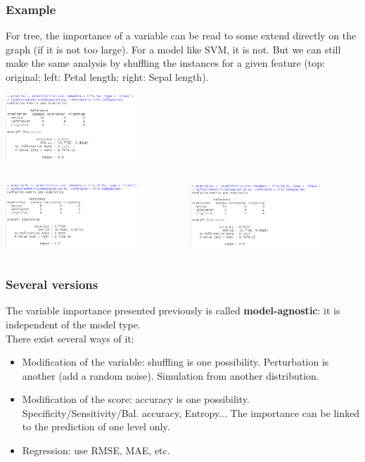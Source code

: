 \begin{frame}
\frametitle{Example}
\small
For tree, the importance of a variable can be read to some extend directly on the graph (if it is not too large). For a model like SVM, it is not. But we can still make the same analysis by shuffling the instances for a given feature (top: original; left: Petal length; right: Sepal length).
\\
\normalsize
\begin{center}
\includegraphics[width=5cm]{../Graphs/VarImp_iris_acc_svm.png}
\end{center}
\begin{columns}
\begin{column}{0.5\textwidth}
\includegraphics[width=5cm]{../Graphs/VarImp_iris_acc_svm_PL.png}
\end{column}
\begin{column}{0.5\textwidth}
\includegraphics[width=5cm]{../Graphs/VarImp_iris_acc_svm_SL.png}
\end{column}
\end{columns}
\end{frame}
\begin{frame}
\frametitle{Several versions}
The variable importance presented previously is called {\bf model-agnostic}: it is independent of the model type.\\ 
\vspace{0.3cm}
There exist several ways of it:
\begin{itemize}
\item Modification of the variable: shuffling is one possibility. Perturbation is another (add a random noise). Simulation from another distribution.
\item Modification of the score: accuracy is one possibility. Specificity/Sensitivity/Bal. accuracy, Entropy... The importance can be linked to the prediction of one level only. 
\item Regression: use RMSE, MAE, etc.
\end{itemize}
\end{frame}
